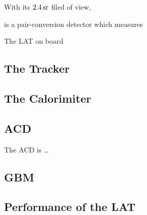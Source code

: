 With its $2.4\,\text{sr}$ filed of view,


is a pair-conversion detector which measures 

The \Ac{LAT} on board 

\subsection{The Tracker}
\subsection{The Calorimiter}
\subsection{\Acl{ACD}}

The \Ac{ACD} is \ldots

\subsection{\Acl{GBM}}


\subsection{Performance of the \acs{LAT}}
